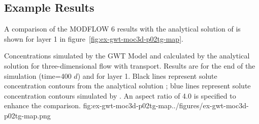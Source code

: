 

\subsection{Example Results}

A comparison of the MODFLOW 6 results with the analytical solution of \cite{wexler1992} is shown for layer 1 in figure~\ref{fig:ex-gwt-moc3d-p02tg-map}.

\begin{StandardFigure}{
                                     Concentrations simulated by the \mf GWT Model and calculated by the analytical solution for three-dimensional flow with transport.  Results are for the end of the simulation (time=400 $d$) and for layer 1.  Black lines represent solute concentration contours from the analytical solution \citep{wexler1992}; blue lines represent solute concentration contours simulated by \mf.  An aspect ratio of 4.0 is specified to enhance the comparison.
                                     }{fig:ex-gwt-moc3d-p02tg-map}{../figures/ex-gwt-moc3d-p02tg-map.png}
\end{StandardFigure}            

                
